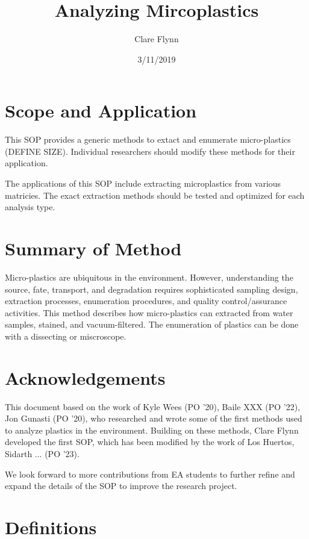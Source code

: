 \documentclass[12pt]{../SOP4_alpha}\usepackage[]{graphicx}\usepackage[]{color}
\title{Analyzing Mircoplastics}
\date{3/11/2019}
\author{Clare Flynn}
\begin{document}
\maketitle

\section{Scope and Application}

\NP This SOP provides a generic methods to extact and enumerate micro-plastics (DEFINE SIZE). Individual researchers should modify these methods for their application. 

\NP The applications of this SOP include extracting microplastics from various matricies. The exact extraction methods should be tested and optimized for each analysis type.

\section{Summary of Method}

\NP Micro-plastics are ubiquitous in the environment. However, understanding the source, fate, transport, and degradation requires sophisticated sampling design, extraction processes, enumeration procedures, and quality control/assurance activities. This method describes how micro-plastics can extracted from water samples, stained, and vacuum-filtered. The enumeration of plastics can be done with a dissecting or miscroscope. 

\tableofcontents

\newpage

\section{Acknowledgements}

This document based on the work of Kyle Wees (PO '20), Baile XXX (PO '22), Jon Gunasti (PO '20), who researched and wrote some of the first methods used to analyze plastics in the environment. Building on these methods, Clare Flynn developed the first SOP, which has been modified by the work of Los Huertos, Sidarth ... (PO '23). 

We look forward to more contributions from EA students to further refine and expand the details of the SOP to improve the research project.

\section{Definitions}
\end{document}
